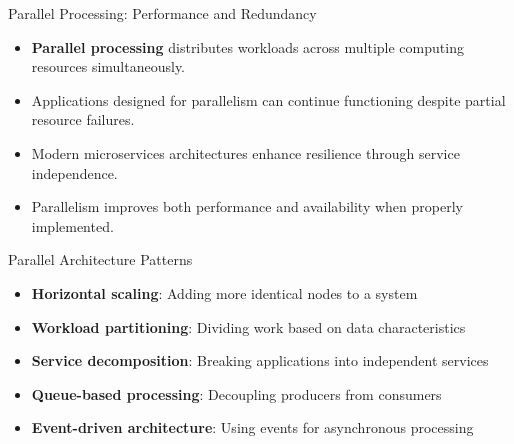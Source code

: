 \documentclass{beamer}
\begin{document}
\begin{frame}{Parallel Processing: Performance and Redundancy}
    \begin{itemize}
        \item \textbf{Parallel processing} distributes workloads across multiple computing resources simultaneously.
        \item Applications designed for parallelism can continue functioning despite partial resource failures.
        \item Modern microservices architectures enhance resilience through service independence.
        \item Parallelism improves both performance and availability when properly implemented.
    \end{itemize}
    
    \begin{block}{Parallel Architecture Patterns}
        \scriptsize
        \begin{itemize}
            \item \textbf{Horizontal scaling}: Adding more identical nodes to a system
            \item \textbf{Workload partitioning}: Dividing work based on data characteristics
            \item \textbf{Service decomposition}: Breaking applications into independent services
            \item \textbf{Queue-based processing}: Decoupling producers from consumers
            \item \textbf{Event-driven architecture}: Using events for asynchronous processing
        \end{itemize}
    \end{block}
\end{frame}
\end{document}
